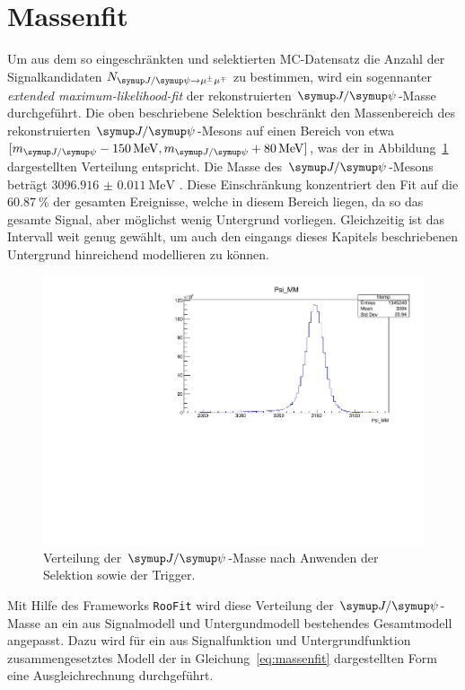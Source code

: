 \section{Massenfit}
%
Um aus dem so eingeschränkten und selektierten MC-Datensatz die Anzahl der Signalkandidaten $N_{\kontroll}$ zu bestimmen, wird ein sogennanter \textit{extended maximum-likelihood-fit} \cite{extended} der rekonstruierten $\jpsi$-Masse durchgeführt. Die oben
beschriebene Selektion beschränkt den Massenbereich des rekonstruierten $\jpsi$-Mesons auf einen Bereich von etwa
$[m_{\jpsi}-\SI{150}{\mega\electronvolt}, m_{\jpsi}+\SI{80}{\mega\electronvolt}]$, was der in Abbildung~\ref{fig:mass} dargestellten Verteilung entspricht. Die Masse des $\jpsi$-Mesons beträgt $\SI{3096.916(11)}{\mega\electronvolt}$ \cite{pdg}. Diese Einschränkung konzentriert den Fit auf die $\SI{60.87}{\percent}$ der gesamten Ereignisse, welche in diesem Bereich liegen, da so das gesamte Signal, aber möglichst wenig Untergrund vorliegen. Gleichzeitig ist das Intervall weit genug gewählt, um auch den eingangs dieses Kapitels beschriebenen Untergrund hinreichend modellieren zu können.
%
\begin{figure}[H]
  \centering
      \includegraphics[width=\textwidth]{Plots/jpsi_mass.pdf}
  \caption{Verteilung der $\jpsi$-Masse nach Anwenden der Selektion sowie der Trigger.}
  \label{fig:mass}
\end{figure}
%
Mit Hilfe des Frameworks \texttt{RooFit} \cite{roofit} wird diese Verteilung der $\jpsi$-Masse an ein aus Signalmodell und Untergundmodell bestehendes Gesamtmodell angepasst. Dazu wird für ein aus Signalfunktion und Untergrundfunktion zusammengesetztes Modell der in Gleichung~\ref{eq:massenfit} dargestellten Form eine Ausgleichrechnung durchgeführt.
